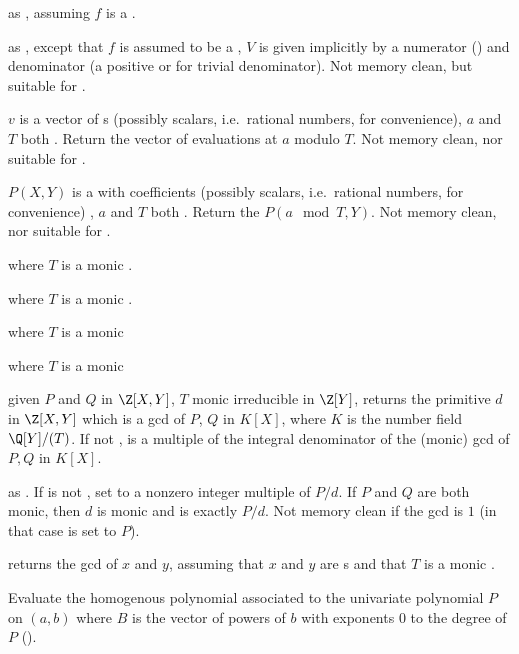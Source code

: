  as , assuming $f$
is a .

 as ,
except that $f$ is assumed to be a , $V$ is given implicitly
by a numerator  () and denominator  (a positive
 or  for trivial denominator). Not memory clean, but
suitable for .

 $v$ is a vector of s
(possibly scalars, i.e.~rational numbers, for convenience), $a$ and $T$ both
. Return the vector of evaluations at $a$ modulo $T$.
Not memory clean, nor suitable for .

 $P(X,Y)$ is a  with
 coefficients (possibly scalars, i.e.~rational numbers, for
convenience) , $a$ and $T$ both . Return the  $P(a \mod
T, Y)$. Not memory clean, nor suitable for .


 where $T$ is a monic .

 where $T$ is a monic .

 where $T$ is a monic 

 where $T$ is a monic 

 given $P$ and $Q$ in
$\Z[X,Y]$, $T$ monic irreducible in $\Z[Y]$, returns the primitive $d$ in
$\Z[X,Y]$ which is a gcd of $P$, $Q$ in $K[X]$, where $K$ is the number field
$\Q[Y]/(T)$. If not ,  is a multiple of the integral
denominator of the (monic) gcd of $P,Q$ in $K[X]$.

 as .
If  is not , set  to a nonzero integer
multiple of $P/d$. If $P$ and $Q$ are both monic, then $d$ is monic and
 is exactly $P/d$. Not memory clean if the gcd is $1$
(in that case  is set to $P$).

 returns the gcd of $x$ and $y$,
assuming that $x$ and $y$ are s and that $T$ is a monic .

Evaluate the homogenous polynomial associated to the univariate polynomial
$P$ on $(a,b)$ where $B$ is the vector of powers of $b$ with exponents
$0$ to the degree of $P$ ().

